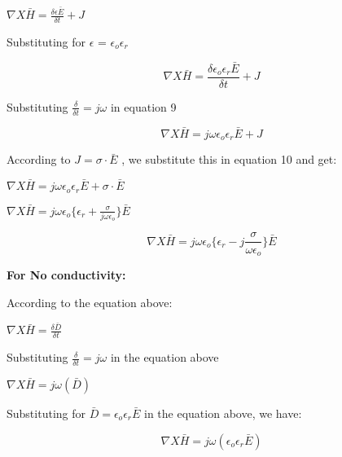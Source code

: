 \begin{center}
	$\nabla X \bar{H} = \frac{\delta\epsilon\bar{E}}{\delta t} + J$
\end{center}

Substituting for $\epsilon$ = $\epsilon_{o}\epsilon_{r}$

\begin{equation}
\nabla X \bar{H} = \frac{\delta\epsilon_{o}\epsilon_{r}\bar{E}}{\delta t} + J
\end{equation}

Substituting $\frac{\delta}{\delta t} = j\omega$ in equation 9

\begin{equation}
\nabla X \bar{H} = j\omega\epsilon_{o}\epsilon_{r}\bar{E} + J
\end{equation}

According to $J = \sigma\cdot\bar{E}$ , we substitute this in equation 10 and get:

\begin{center}
	$\nabla X \bar{H} = j\omega\epsilon_{o}\epsilon_{r}\bar{E} + \sigma\cdot\bar{E}$ 
\end{center}

\begin{center}
	$\nabla X \bar{H} = j\omega\epsilon_{o}\{\epsilon_{r} + \frac{\sigma}{j\omega\epsilon_{o}}\}\bar{E}$ 
\end{center}

\begin{equation}
\nabla X \bar{H} = j\omega\epsilon_{o}\Bigg\{\epsilon_{r} -j \frac{\sigma}{\omega\epsilon_{o}}\Bigg\}\bar{E} 
\end{equation}

\textbf{For No conductivity:}

According to the equation above:

\begin{center}
	$\nabla X \bar{H} = \frac{\delta \bar {D}}{\delta t}$
\end{center}

Substituting $\frac{\delta}{\delta t} = j\omega$ in the equation above

\begin{center}
	$\nabla X \bar{H} = j \omega(\bar{D})$
\end{center}

Substituting for $\bar{D} = \epsilon_{o}\epsilon_{r}\bar{E}$ in the equation above, we have:

\begin{equation}
\nabla X \bar{H} = j \omega(\epsilon_{o}\epsilon_{r}\bar{E})
\end{equation}



